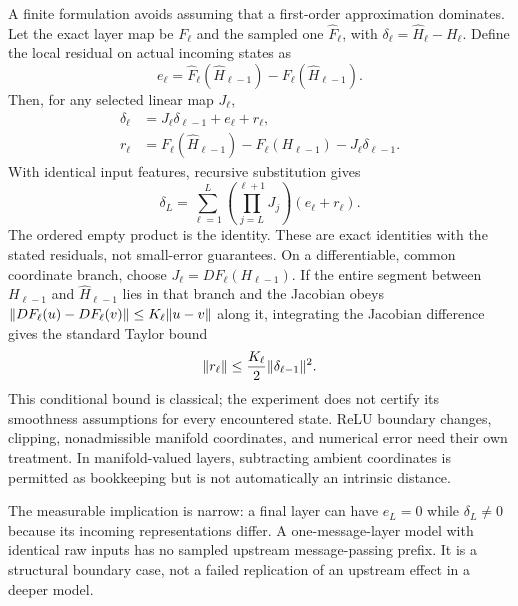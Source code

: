 A finite formulation avoids assuming that a first-order approximation dominates. Let the exact layer map be $F_\ell$ and the sampled one $\widehat F_\ell$, with $\delta_\ell=\widehat H_\ell-H_\ell$. Define the local residual on actual incoming states as
\begin{equation}
e_\ell=\widehat F_\ell(\widehat H_{\ell-1})-F_\ell(\widehat H_{\ell-1}).
\end{equation}
Then, for any selected linear map $J_\ell$,
\begin{equation}
\begin{aligned}
\delta_\ell&=J_\ell\delta_{\ell-1}+e_\ell+r_\ell,\\
r_\ell&=F_\ell(\widehat H_{\ell-1})-F_\ell(H_{\ell-1})-J_\ell\delta_{\ell-1}.
\end{aligned}
\label{eq:prop}
\end{equation}
With identical input features, recursive substitution gives
\begin{equation}
\delta_L=\sum_{\ell=1}^{L}\left(\prod_{j=L}^{\ell+1}J_j\right)(e_\ell+r_\ell).
\label{eq:unroll}
\end{equation}
The ordered empty product is the identity. These are exact identities with the stated residuals, not small-error guarantees. On a differentiable, common coordinate branch, choose $J_\ell=DF_\ell(H_{\ell-1})$. If the entire segment between $H_{\ell-1}$ and $\widehat H_{\ell-1}$ lies in that branch and the Jacobian obeys $\lVert DF_\ell(u)-DF_\ell(v)\rVert\leq K_\ell\lVert u-v\rVert$ along it, integrating the Jacobian difference gives the standard Taylor bound \cite{nocedal2006numerical}
\begin{equation}
\lVert r_\ell\rVert\leq \frac{K_\ell}{2}\lVert \delta_{\ell-1}\rVert^2.
\end{equation}
This conditional bound is classical; the experiment does not certify its smoothness assumptions for every encountered state. ReLU boundary changes, clipping, nonadmissible manifold coordinates, and numerical error need their own treatment. In manifold-valued layers, subtracting ambient coordinates is permitted as bookkeeping but is not automatically an intrinsic distance.

The measurable implication is narrow: a final layer can have $e_L=0$ while $\delta_L\ne0$ because its incoming representations differ. A one-message-layer model with identical raw inputs has no sampled upstream message-passing prefix. It is a structural boundary case, not a failed replication of an upstream effect in a deeper model.

